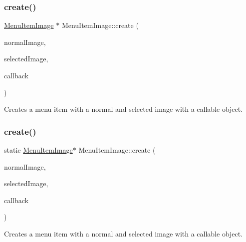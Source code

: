 \subsubsection{\texorpdfstring{create()}{create()}\hspace{0.1cm}{\footnotesize\ttfamily [9/14]}}
{\footnotesize\ttfamily \hyperlink{classMenuItemImage}{Menu\+Item\+Image} $\ast$ Menu\+Item\+Image\+::create (\begin{DoxyParamCaption}\item[{const std\+::string \&}]{normal\+Image,  }\item[{const std\+::string \&}]{selected\+Image,  }\item[{const cc\+Menu\+Callback \&}]{callback }\end{DoxyParamCaption})\hspace{0.3cm}{\ttfamily [static]}}

Creates a menu item with a normal and selected image with a callable object. \mbox{\label{classMenuItemImage_aa6212bd476d3c22af8b05c821dcec2af}} 
\subsubsection{\texorpdfstring{create()}{create()}\hspace{0.1cm}{\footnotesize\ttfamily [10/14]}}
{\footnotesize\ttfamily static \hyperlink{classMenuItemImage}{Menu\+Item\+Image}$\ast$ Menu\+Item\+Image\+::create (\begin{DoxyParamCaption}\item[{const std\+::string \&}]{normal\+Image,  }\item[{const std\+::string \&}]{selected\+Image,  }\item[{const cc\+Menu\+Callback \&}]{callback }\end{DoxyParamCaption})\hspace{0.3cm}{\ttfamily [static]}}

Creates a menu item with a normal and selected image with a callable object. \mbox{\label{classMenuItemImage_a3fcb8eed93782b2888c6f02d226164b5}} 
